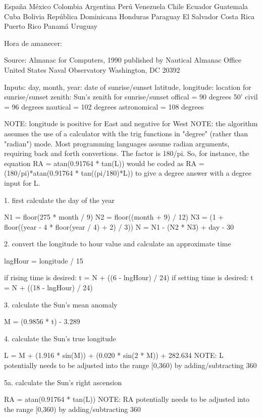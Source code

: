 España
México
Colombia
Argentina
Perú
Venezuela
Chile
Ecuador
Guatemala
Cuba
Bolivia
República Dominicana
Honduras
Paraguay
El Salvador
Costa Rica
Puerto Rico
Panamá
Uruguay



Hora de amanecer:

Source:
	Almanac for Computers, 1990
	published by Nautical Almanac Office
	United States Naval Observatory
	Washington, DC 20392

Inputs:
	day, month, year:      date of sunrise/sunset
	latitude, longitude:   location for sunrise/sunset
	zenith:                Sun's zenith for sunrise/sunset
	  offical      = 90 degrees 50'
	  civil        = 96 degrees
	  nautical     = 102 degrees
	  astronomical = 108 degrees
	
	NOTE: longitude is positive for East and negative for West
        NOTE: the algorithm assumes the use of a calculator with the
        trig functions in "degree" (rather than "radian") mode. Most
        programming languages assume radian arguments, requiring back
        and forth convertions. The factor is 180/pi. So, for instance,
        the equation RA = atan(0.91764 * tan(L)) would be coded as RA
        = (180/pi)*atan(0.91764 * tan((pi/180)*L)) to give a degree
        answer with a degree input for L.


1. first calculate the day of the year

	N1 = floor(275 * month / 9)
	N2 = floor((month + 9) / 12)
	N3 = (1 + floor((year - 4 * floor(year / 4) + 2) / 3))
	N = N1 - (N2 * N3) + day - 30

2. convert the longitude to hour value and calculate an approximate time

	lngHour = longitude / 15
	
	if rising time is desired:
	  t = N + ((6 - lngHour) / 24)
	if setting time is desired:
	  t = N + ((18 - lngHour) / 24)

3. calculate the Sun's mean anomaly
	
	M = (0.9856 * t) - 3.289

4. calculate the Sun's true longitude
	
	L = M + (1.916 * sin(M)) + (0.020 * sin(2 * M)) + 282.634
	NOTE: L potentially needs to be adjusted into the range [0,360) by adding/subtracting 360

5a. calculate the Sun's right ascension
	
	RA = atan(0.91764 * tan(L))
	NOTE: RA potentially needs to be adjusted into the range [0,360) by adding/subtracting 360

